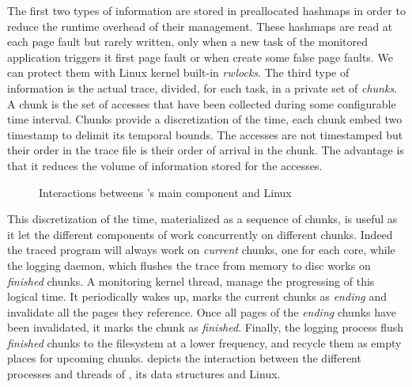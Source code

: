 The first two types of information are stored in preallocated hashmaps in order to reduce the
runtime overhead of their management.  These hashmaps are read at each page fault but rarely
written, only when a new task of the monitored application triggers it first page
fault or when \Moca create some false page faults. We can protect
them with Linux kernel built-in \emph{rwlocks}.
The third type of information is the actual
trace, divided, for each task, in a private set of \emph{chunks}. A chunk is the set of
accesses that have been collected during some configurable time interval. Chunks provide a discretization
of the time, each chunk embed two timestamp to delimit its temporal bounds.
The accesses are not timestamped but their order in the trace file is their
order of arrival in the chunk.
The advantage is that it reduces the volume of information stored for the accesses.

\begin{figure}[htb]
    \centering
    \caption{Interactions betweens \Moca's main component and Linux}
    \label{fig:moca}
\end{figure}

This discretization of the time, materialized as a sequence of chunks, is useful as it let the
different components of \Moca work concurrently on different chunks.  Indeed the traced
program will always work on \emph{current} chunks, one for each core, while the logging daemon,
which flushes the trace from memory to disc works on \emph{finished} chunks. A
monitoring kernel thread, manage the progressing of this logical time. It periodically wakes up, marks the current chunks as
\emph{ending} and invalidate all the pages they reference. Once all pages of the \emph{ending}
chunks have been invalidated, it marks the chunk as \emph{finished}. Finally, the
logging process flush \emph{finished} chunks to the filesystem at a lower
frequency, and recycle them as empty places for upcoming chunks.   depicts the interaction between the
different processes and threads of \Moca, its data structures and Linux.


